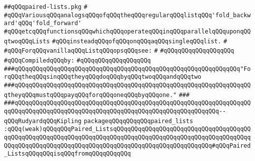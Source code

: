 \label{src/lib/std/src/paired-lists.pkg}
\verb|##qQQqpaired-lists.pkg|\newline
\verb|#|\newline
\verb|#qQQqVariousqQQqanalogsqQQqofqQQqtheqQQqregularqQQqlistqQQq'fold_backward'qQQq'fold_forward'|\newline
\verb|#qQQqetcqQQqfunctionsqQQqwhichqQQqoperateqQQqinqQQqparallelqQQquponqQQqtwoqQQqLists|\newline
\verb|#qQQqinsteadqQQqofqQQqonqQQqaqQQqsingleqQQqlist.|\newline
\verb|#|\newline
\verb|#qQQqForqQQqvanillaqQQqListqQQqopsqQQqsee:|\newline
\verb|#|\newline
\verb|#qQQqqQQqqQQqqQQqqQQq|\newline
\newline
\verb|#qQQqCompiledqQQqby:|\newline
\verb|#qQQqqQQqqQQqqQQqqQQq|\newline
\newline
\newline
\newline
\verb|###qQQqqQQqqQQqqQQqqQQqqQQqqQQqqQQqqQQqqQQqqQQqqQQqqQQqqQQqqQQqqQQq"ForqQQqtheqQQqsinqQQqtheyqQQqdoqQQqbyqQQqtwoqQQqandqQQqtwo|\newline
\verb|###qQQqqQQqqQQqqQQqqQQqqQQqqQQqqQQqqQQqqQQqqQQqqQQqqQQqqQQqqQQqqQQqqQQqtheyqQQqmustqQQqpayqQQqforqQQqoneqQQqbyqQQqone."|\newline
\verb|###|\newline
\verb|###qQQqqQQqqQQqqQQqqQQqqQQqqQQqqQQqqQQqqQQqqQQqqQQqqQQqqQQqqQQqqQQqqQQqqQQqqQQqqQQqqQQqqQQqqQQqqQQqqQQqqQQqqQQqqQQqqQQqqQQqqQQqqQQq--qQQqRudyardqQQqKipling|\newline
\newline
\newline
\newline
\verb|packageqQQqqQQqqQQqpaired_lists|\newline
\verb|:qQQq(weak)qQQqqQQqPaired_ListsqQQqqQQqqQQqqQQqqQQqqQQqqQQqqQQqqQQqqQQqqQQqqQQqqQQqqQQqqQQqqQQqqQQqqQQqqQQqqQQqqQQqqQQqqQQqqQQqqQQqqQQqqQQqqQQqqQQqqQQqqQQqqQQqqQQqqQQqqQQqqQQqqQQqqQQqqQQqqQQqqQQqqQQq#qQQqPaired_ListsqQQqqQQqisqQQqfromqQQqqQQqqQQq|\newline

